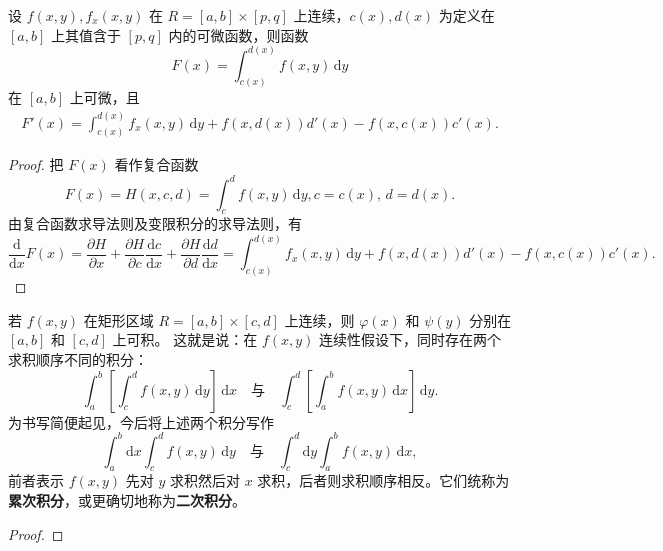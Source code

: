 \documentclass[../../main.tex]{subfiles}%
\begin{document}
\begin{theorem}[可微性]\label{theorem:含参量积分的可微性2}
设 \( f(x,y), f_x(x,y) \) 在 \( R = [a,b] \times [p,q] \) 上连续，\( c(x), d(x) \) 为定义在 \( [a,b] \) 上其值含于 \( [p,q] \) 内的可微函数，则函数
\[
F(x) = \int_{c(x)}^{d(x)} f(x,y) \, \mathrm{d}y
\]
在 \( [a,b] \) 上可微，且
\begin{align}
F'(x) = \int_{c(x)}^{d(x)} f_x(x,y) \, \mathrm{d}y + f(x,d(x)) d'(x) - f(x,c(x)) c'(x). \label{eq::-------6486-7}
\end{align}
\end{theorem} 
\begin{proof}

把 \( F(x) \) 看作复合函数
\[
F(x) = H(x,c,d) = \int_{c}^{d} f(x,y) \, \mathrm{d}y,
c = c(x), \, d = d(x).
\]
由复合函数求导法则及变限积分的求导法则，有
\[
\frac{\mathrm{d}}{\mathrm{d}x} F(x) = \frac{\partial H}{\partial x} + \frac{\partial H}{\partial c} \frac{\mathrm{d}c}{\mathrm{d}x} + \frac{\partial H}{\partial d} \frac{\mathrm{d}d}{\mathrm{d}x}
= \int_{c(x)}^{d(x)} f_x(x,y) \, \mathrm{d}y + f(x,d(x)) d'(x) - f(x,c(x)) c'(x).
\]

\end{proof}

\begin{theorem}[可积性]\label{theorem:含参量正常积分的可积性定理}
若 \( f(x,y) \) 在矩形区域 \( R = [a,b] \times [c,d] \) 上连续，则 \( \varphi(x) \) 和 \( \psi(y) \) 分别在 \( [a,b] \) 和 \( [c,d] \) 上可积。
这就是说：在 \( f(x,y) \) 连续性假设下，同时存在两个求积顺序不同的积分：
\[
\int_{a}^{b} \left[ \int_{c}^{d} f(x,y) \, \mathrm{d}y \right] \, \mathrm{d}x \quad \text{与} \quad \int_{c}^{d} \left[ \int_{a}^{b} f(x,y) \, \mathrm{d}x \right] \, \mathrm{d}y.
\]
为书写简便起见，今后将上述两个积分写作
\[
\int_{a}^{b} \mathrm{d}x \int_{c}^{d} f(x,y) \, \mathrm{d}y \quad \text{与} \quad \int_{c}^{d} \mathrm{d}y \int_{a}^{b} f(x,y) \, \mathrm{d}x,
\]
前者表示 \( f(x,y) \) 先对 \( y \) 求积然后对 \( x \) 求积，后者则求积顺序相反。它们统称为\textbf{累次积分}，或更确切地称为\textbf{二次积分}。
\end{theorem}
\begin{proof}



\end{proof}
\end{document}
